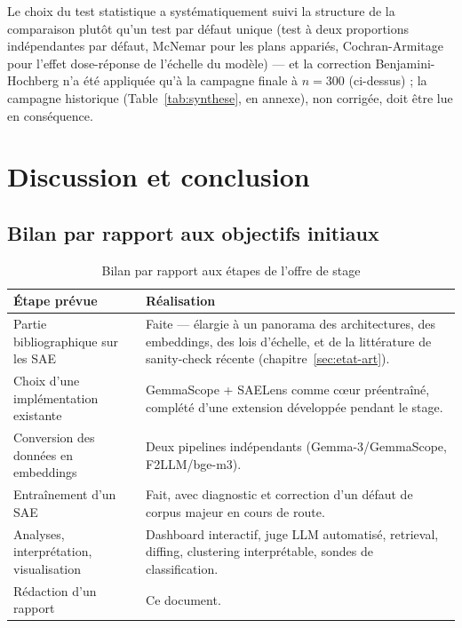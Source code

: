 \documentclass[11pt]{article}
\begin{document}
Le choix du test statistique a systématiquement suivi la structure de la
comparaison plutôt qu'un test par défaut unique (test à deux proportions
indépendantes par défaut, McNemar pour les plans appariés, Cochran-Armitage
pour l'effet dose-réponse de l'échelle du modèle) --- et la correction
Benjamini-Hochberg n'a été appliquée qu'à la campagne finale à $n=300$
(ci-dessus) ; la campagne historique (Table~\ref{tab:synthese}, en annexe),
non corrigée, doit être lue en conséquence.

\newpage

\section{Discussion et conclusion}
\label{sec:discussion}

\subsection{Bilan par rapport aux objectifs initiaux}

\begin{table}[h!]
\centering
\caption{Bilan par rapport aux étapes de l'offre de stage}
\vspace{0.4em}\small
\begin{tabular}{@{}p{5.5cm}p{8.5cm}@{}}
\toprule
\textbf{Étape prévue} & \textbf{Réalisation} \\ \midrule
Partie bibliographique sur les SAE & Faite --- élargie à un panorama des
  architectures, des embeddings, des lois d'échelle, et de la littérature de
  sanity-check récente (chapitre~\ref{sec:etat-art}). \\
Choix d'une implémentation existante & GemmaScope + SAELens comme cœur
  préentraîné, complété d'une extension développée pendant le stage. \\
Conversion des données en embeddings & Deux pipelines indépendants
  (Gemma-3/GemmaScope, F2LLM/bge-m3). \\
Entraînement d'un SAE & Fait, avec diagnostic et correction d'un défaut de
  corpus majeur en cours de route. \\
Analyses, interprétation, visualisation & Dashboard interactif, juge LLM
  automatisé, retrieval, diffing, clustering interprétable, sondes de
  classification. \\
Rédaction d'un rapport & Ce document. \\
\bottomrule
\end{tabular}
\end{table}
\end{document}
